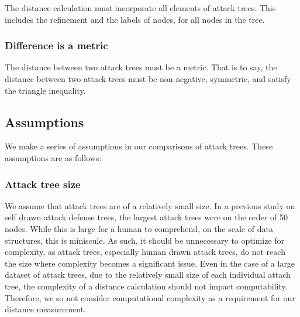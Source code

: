 The distance calculation must incorporate all elements of attack trees. This includes the refinement  and the labels of nodes, for all nodes in the tree.

\subsubsection{Difference is a metric}

The distance between two attack trees must be a metric. That is to say, the distance between two attack trees must be non-negative, symmetric, and satisfy the triangle inequality.



\subsection{Assumptions}

We make a series of assumptions in our comparisons of attack trees. These assumptions are as follows:  

\subsubsection{Attack tree size}

We assume that attack trees are of a relatively small size. In a previous study on self drawn attack defense trees, the largest attack trees were on the order of 50 nodes. While this is large for a human to comprehend, on the scale of data structures, this is miniscule. As such, it should be unnecessary to optimize for complexity, as attack trees, especially human drawn attack trees, do not reach the size where complexity becomes a significant issue. Even in the case of a large dataset of attack trees, due to the relatively small size of each individual attach tree, the complexity of a distance calculation should not impact computability. Therefore, we so not consider computational complexity as a requirement for our distance measurement.




